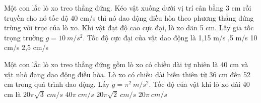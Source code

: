 \begin{vidu}%
Một con lắc lò xo treo thẳng đứng. Kéo vật xuống dưới vị trí cân bằng 3 cm rồi truyền cho nó tốc độ 40 cm/s thì nó dao động điều hòa theo phương thẳng đứng trùng với trục của lò xo. Khi vật đạt độ cao cực đại, lò xo dãn 5 cm. Lấy gia tốc trọng trường $g = 10\ m/s^2$. Tốc độ cực đại của vật dao động là
\choice
{1,15 m/s}
{,5 m/s}
{10 cm/s}
{2,5 cm/s}
\loigiai{
}
\end{vidu} %

\begin{vidu}%
Một con lắc lò xo treo thẳng đứng gồm lò xo có chiều dài tự nhiên là 40 cm và vật nhỏ đang dao động điều hòa. Lò xo có chiều dài biến thiên từ 36 cm đến 52 cm trong quá trình dao động. Lấy $g = \pi^2 \ m/s^2$. Tốc độ của vật khi lò xo dài 40 cm là
\choice
{\True $20\pi \sqrt{3}\ cm/s$}
{$40\pi\ cm/s$}
{$20\pi \sqrt{2}\ cm/s$}
{$20\pi\ cm/s$}
\end{vidu} %















